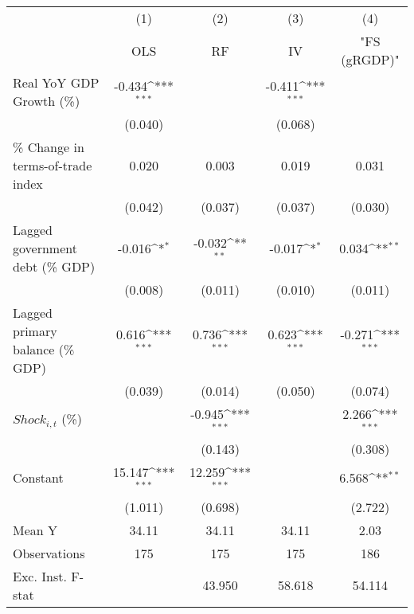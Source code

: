 {
\def\sym#1{\ifmmode^{#1}\else\(^{#1}\)\fi}
\begin{tabular}{l*{4}{c}}
\toprule
                    &\multicolumn{1}{c}{(1)}&\multicolumn{1}{c}{(2)}&\multicolumn{1}{c}{(3)}&\multicolumn{1}{c}{(4)}\\
                    &\multicolumn{1}{c}{OLS}&\multicolumn{1}{c}{RF}&\multicolumn{1}{c}{IV}&\multicolumn{1}{c}{ "FS (gRGDP)" }\\
\midrule
Real YoY GDP Growth (\%)&      -0.434\sym{***}&                     &      -0.411\sym{***}&                     \\
                    &     (0.040)         &                     &     (0.068)         &                     \\
\addlinespace
\% Change in terms-of-trade index&       0.020         &       0.003         &       0.019         &       0.031         \\
                    &     (0.042)         &     (0.037)         &     (0.037)         &     (0.030)         \\
\addlinespace
Lagged government debt (\% GDP)&      -0.016\sym{*}  &      -0.032\sym{**} &      -0.017\sym{*}  &       0.034\sym{**} \\
                    &     (0.008)         &     (0.011)         &     (0.010)         &     (0.011)         \\
\addlinespace
Lagged primary balance (\% GDP)&       0.616\sym{***}&       0.736\sym{***}&       0.623\sym{***}&      -0.271\sym{***}\\
                    &     (0.039)         &     (0.014)         &     (0.050)         &     (0.074)         \\
\addlinespace
$ Shock_{i,t}$ (\%) &                     &      -0.945\sym{***}&                     &       2.266\sym{***}\\
                    &                     &     (0.143)         &                     &     (0.308)         \\
\addlinespace
Constant            &      15.147\sym{***}&      12.259\sym{***}&                     &       6.568\sym{**} \\
                    &     (1.011)         &     (0.698)         &                     &     (2.722)         \\
\midrule
Mean Y              &       34.11         &       34.11         &       34.11         &        2.03         \\
Observations        &         175         &         175         &         175         &         186         \\
Exc. Inst. F-stat   &                     &      43.950         &      58.618         &      54.114         \\
\bottomrule
\end{tabular}
}
